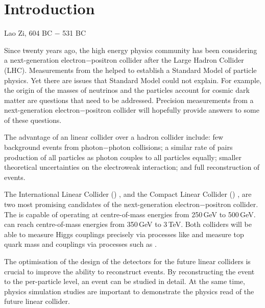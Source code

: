 \chapter{Introduction}
\label{chap:Introduction}



%
{Lao Zi, 604 BC $-$ 531 BC}%

Since twenty years ago, the high energy physics community has been considering a next-generation electron$-$positron collider after the Large Hadron Collider (LHC). Measurements from the \LHC helped to establish a Standard Model of particle physics. Yet there are issues that Standard Model could not explain. For example, the origin of the masses of neutrinos and the particles account for cosmic dark matter are questions that need to be addressed. Precision measurements from a next-generation electron$-$positron collider will hopefully provide answers to some of these questions.

The advantage of an \ee linear collider over a hadron collider include: few background events from photon$-$photon collisions; a similar rate  of pairs  production of all particles as photon couples to all particles equally; smaller  theoretical uncertainties on the electroweak interaction; and full reconstruction of events.

The International Linear Collider (\ILC)  \cite{Brau:2007zza}, and the Compact Linear Collider (\CLIC) \cite{Linssen:2012hp}, are two most promising candidates of the next-generation electron$-$positron collider. The \ILC is capable of operating at centre-of-mass energies from 250\,GeV to 500\,GeV. \CLIC can reach centre-of-mass energies from 350\,GeV to 3\,TeV. Both colliders will be able to measure Higgs couplings precisely via processes like \HepProcess{\ee \to \PZ \PHiggs} and measure top quark mass and couplings via processes such as \HepProcess{\ee \to \Ptop \APtop}.

The optimisation of the design of the detectors for the future linear colliders is crucial to improve the ability to reconstruct events. By reconstructing the event to the per-particle level, an event can be studied in detail. At the same time,  physics simulation studies are important to demonstrate the physics read of the future linear collider. 

